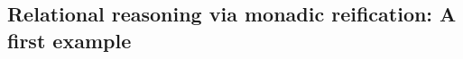 \documentclass[sigplan,screen]{acmart}\settopmatter{}
\newcommand{\comm}[3]{\ifcheckpagebudget\else\ifdraft{\maybecolor{#1}[#2: #3]}\fi\fi}
\newcommand{\ch}[1]{\comm{teal}{CH}{#1}}
\begin{document}


%




%




\subsection{\iffull Relational reasoning via monadic reification:\fi{}
  A first example}
\label{sec:first-example}
\end{document}
